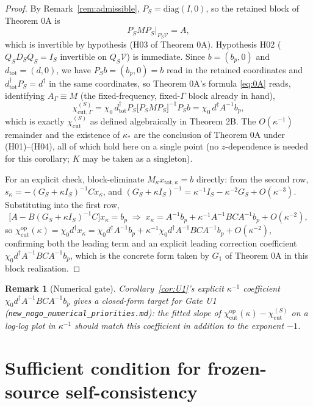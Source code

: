 \documentclass[11pt]{article}
\newtheorem{remark}[theorem]{Remark}
\begin{document}
\begin{proof}
By Remark~\ref{rem:admissible}, $P_S=\mathrm{diag}(I,0)$, so the retained
block of Theorem 0A is
\[
P_SMP_S|_{P_S\mathcal V}=A,
\]
which is invertible by hypothesis (H03 of Theorem 0A). Hypothesis H02
($Q_SD_SQ_S=I_S$ invertible on $Q_S\mathcal V$) is immediate. Since
$b=(b_p,0)$ and $d_{\mathrm{tot}}=(d,0)$, we have $P_Sb=(b_p,0)=b$ read
in the retained coordinates and $d_{\mathrm{tot}}^\dagger P_S=d^\dagger$
in the same coordinates, so Theorem 0A's formula \eqref{eq:0A} reads,
identifying $A_\Gamma\equiv M$ (the fixed-frequency, fixed-$\Gamma$
block already in hand),
\[
\chi_{\mathrm{cut},\Gamma}^{(S)}
=\chi_0\,d_{\mathrm{tot}}^\dagger P_S\bigl[P_SMP_S\bigr]^{-1}P_Sb
=\chi_0\,d^\dagger A^{-1}b_p,
\]
which is exactly $\chi_{\mathrm{cut}}^{(S)}$ as defined algebraically in
Theorem 2B. The $O(\kappa^{-1})$ remainder and the existence of
$\kappa_*$ are the conclusion of Theorem 0A under (H01)--(H04), all of
which hold here on a single point (no $z$-dependence is needed for this
corollary; $K$ may be taken as a singleton).

For an explicit check, block-eliminate $M_\kappa x_{\mathrm{tot},\kappa}=b$
directly: from the second row, $s_\kappa=-(G_S+\kappa I_S)^{-1}Cx_\kappa$,
and $(G_S+\kappa I_S)^{-1}=\kappa^{-1}I_S-\kappa^{-2}G_S+O(\kappa^{-3})$.
Substituting into the first row,
\[
\bigl[A-B(G_S+\kappa I_S)^{-1}C\bigr]x_\kappa=b_p
\;\Longrightarrow\;
x_\kappa=A^{-1}b_p+\kappa^{-1}A^{-1}BCA^{-1}b_p+O(\kappa^{-2}),
\]
so $\chi_{\mathrm{cut}}^{\mathrm{op}}(\kappa)=\chi_0d^\dagger x_\kappa
=\chi_0d^\dagger A^{-1}b_p+\kappa^{-1}\chi_0d^\dagger A^{-1}BCA^{-1}b_p+O(\kappa^{-2})$,
confirming both the leading term and an explicit leading correction
coefficient $\chi_0d^\dagger A^{-1}BCA^{-1}b_p$, which is the concrete
form taken by $G_1$ of Theorem 0A in this block realization.
\end{proof}

\begin{remark}[Numerical gate]
Corollary~\ref{cor:U1}'s explicit $\kappa^{-1}$ coefficient
$\chi_0d^\dagger A^{-1}BCA^{-1}b_p$ gives a closed-form target for Gate
U1 (\texttt{new\_nogo\_numerical\_priorities.md}): the fitted slope of
$\chi_{\mathrm{cut}}^{\mathrm{op}}(\kappa)-\chi_{\mathrm{cut}}^{(S)}$ on a
log-log plot in $\kappa^{-1}$ should match this coefficient in addition
to the exponent $-1$.
\end{remark}

\section{Sufficient condition for frozen-source self-consistency}
\end{document}

